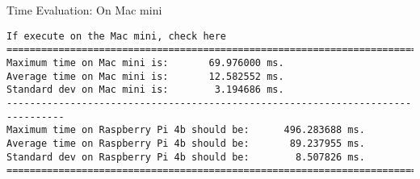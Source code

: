 \begin{frame}[fragile]{Time Evaluation: On Mac mini}
\tiny
{
\begin{verbatim}If execute on the Mac mini, check here
================================================================================
Maximum time on Mac mini is:       69.976000 ms.
Average time on Mac mini is:       12.582552 ms.
Standard dev on Mac mini is:        3.194686 ms.
--------------------------------------------------------------------------------
Maximum time on Raspberry Pi 4b should be:      496.283688 ms.
Average time on Raspberry Pi 4b should be:       89.237955 ms.
Standard dev on Raspberry Pi 4b should be:        8.507826 ms.
================================================================================
\end{verbatim}
}
\end{frame}
